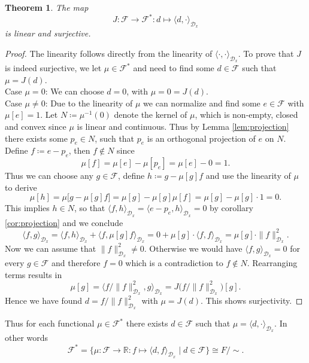 \documentclass[11pt, a4paper]{article}
\newtheorem{theorem}{Theorem}[section]
\newcommand{\R}{\mathbb{R}}
\newcommand{\D}{\mathcal{D}}
\newcommand{\F}{\mathcal{F}}
\begin{document}
\begin{theorem} \label{thm:riesz}
The map
\[ J: \F \to \F^* : d \mapsto \langle d, \cdot \rangle_{\D_x} \]
is linear and surjective.
\end{theorem}

\begin{proof}
The linearity follows directly from the linearity of $\langle \cdot, \cdot \rangle_{\D_x}$. To prove that $J$ is indeed surjective, we let $\mu \in \F^*$ and need to find some $d \in \F$ such that $\mu = J(d)$. \\

Case $\mu=0$: We can choose $d=0$, with $\mu = 0 = J(d)$. \\

Case $\mu \neq 0$: Due to the linearity of $\mu$ we can normalize and find some $e \in \F$ with $\mu[e] = 1$. Let $N \coloneq \mu^{-1}(0)$ denote the kernel of $\mu$, which is non-empty, closed and convex since $\mu$ is linear and continuous. Thus by Lemma \ref{lem:projection} there exists some $p_e \in N$, such that $p_e$ is an orthogonal projection of $e$ on $N$. Define $f \coloneq e - p_e$, then $f \notin N$ since
\[ \mu[f] = \mu[e] - \mu[p_e] = \mu[e] - 0 = 1. \]
Thus we can choose any $g \in \F$, define $h \coloneq g - \mu[g]f$ and use the linearity of $\mu$ to derive
\[ \mu[h] = \mu \big [g- \mu[g]f \big] = \mu[g] - \mu[g] \mu[f] = \mu[g] - \mu[g] \cdot 1 = 0. \]
This implies $h \in N$, so that $\langle f , h \rangle_{\D_x} = \langle e - p_e, h \rangle_{\D_x} = 0$ by corollary \ref{cor:projection} and we conclude
\[ \langle f, g \rangle_{\D_x} = \langle f , h \rangle_{\D_x} + \langle f , \mu[g]f \rangle_{\D_x} = 0 + \mu[g] \cdot \langle f , f \rangle_{\D_x} = \mu[g] \cdot \| f \|_{\D_x}^2. \]
Now we can assume that $\| f \|_{\D_x}^2 \neq 0$. Otherwise we would have $\langle f, g \rangle_{\D_x} = 0$ for every $g \in \F$ and therefore $f = 0$ which is a contradiction to $f \notin N$. Rearranging terms results in
\[ \mu[g] = \big \langle f / \| f \|_{\D_x}^2 , g \big \rangle_{\D_x} = J \big (f / \| f \|_{\D_x}^2 \big)[g]. \]
Hence we have found $d = f / \| f \|_{\D_x}^2$ with $\mu = J(d)$. This shows surjectivity.
\end{proof}

Thus for each functional $\mu \in \F^*$ there exists $d \in \F$ such that $\mu = \langle d, \cdot \rangle_{\D_x}$. In other words
\[ \F^* = \Big \{ \mu : \F \to \R : f \mapsto \langle d,f \rangle _{\D_x} \mid d \in \F \Big \} \cong F/{\sim}. \]
\end{document}

